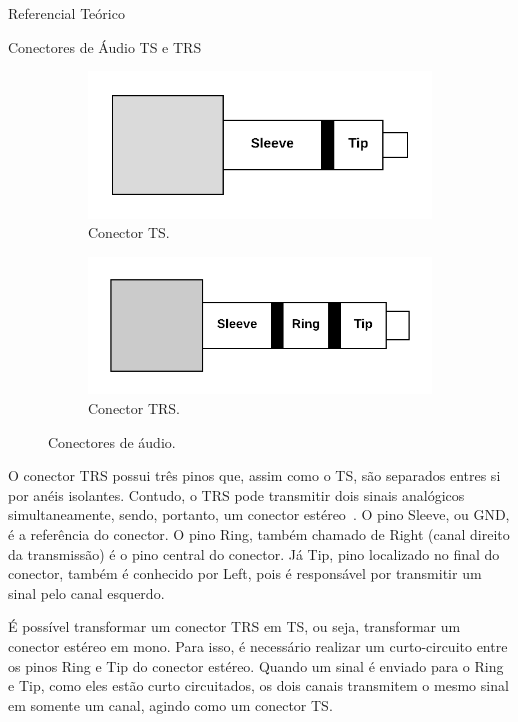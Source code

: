 \begin{chapter}{Referencial Teórico}
\begin{section}{Conectores de Áudio TS e TRS}
\begin{figure}
\centering
\begin{subfigure}{.4\textwidth}
  \centering
  \includegraphics[width=1\linewidth, height=0.2\textheight]{fig/ts}
  \caption{Conector TS.}
  \label{fig:ts}
\end{subfigure}%
\begin{subfigure}{0.4\textwidth}
  \centering
  \includegraphics[width=1\linewidth, height=0.2\textheight]{fig/trs}
  \caption{Conector TRS.}
  \label{fig:trs}
\end{subfigure}
\caption{Conectores de áudio.}
\label{fig:conector}
\end{figure}

O conector TRS possui três pinos que, assim como o TS, são separados 
entres si por anéis isolantes. Contudo, o TRS pode transmitir dois sinais
analógicos simultaneamente, sendo, portanto, um conector estéreo~\cite{ts}. O
pino Sleeve, ou GND, é a referência do conector. O pino Ring, também chamado de
Right (canal direito da transmissão) é o  pino central do conector. Já Tip,
pino localizado no final do conector, também é conhecido por Left, pois é 
responsável por transmitir um sinal pelo canal esquerdo.

\break 
É possível transformar um conector TRS em TS, ou seja, transformar um conector
estéreo em mono. Para isso, é necessário realizar um curto-circuito entre os
pinos Ring e Tip do conector estéreo. Quando um sinal é enviado para o Ring e
Tip, como eles estão curto circuitados, os dois canais transmitem o mesmo
sinal em somente um canal, agindo como um conector TS.



\end{section}
\end{chapter}
